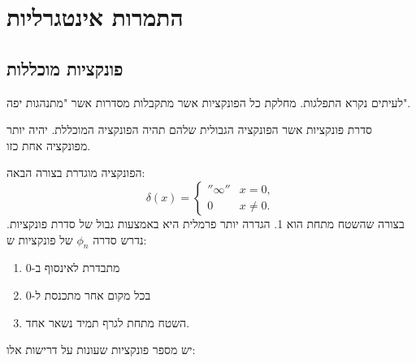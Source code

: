 \documentclass{tstextbook}
\begin{document}
\section{התמרות אינטגרליות}

\subsection{פונקציות מוכללות}

\begin{definition}
לעיתים נקרא התפלגות. מחלקת כל הפונקציות אשר מתקבלות מסדרות אשר "מתנהגות יפה".

\end{definition}
\begin{definition}
סדרת פונקציות אשר הפונקציה הגבולית שלהם תהיה הפונקציה המוכללת. יהיה יותר מפונקציה אחת כזו.

\end{definition}
\begin{definition}
הפונקציה מוגדרת בצורה הבאה:
$$ \delta(x)=\left\{\begin{matrix}''\infty''&x=0,\\0&x\ne0.\end{matrix}\right.$$
בצורה שהשטח מתחת הוא 1.
הגדרה יותר פרמלית היא באמצעות גבול של סדרת פונקציות. נדרש סדרה \(\phi_{n}\) של פונקציות ש:

  \begin{enumerate}
    \item מתבדרת לאינסוף ב-0 


    \item בכל מקום אחר מתכנסת ל-0  


    \item השטח מתחת לגרף תמיד נשאר אחד. 


  \end{enumerate}
\end{definition}
יש מספר פונקציות שעונות על דרישות אלו:
\end{document}
